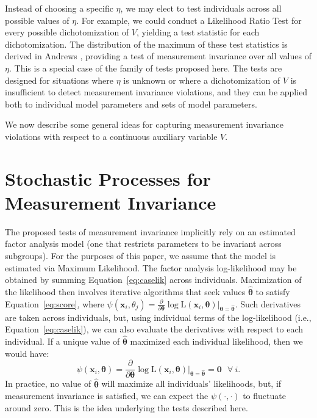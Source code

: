 \documentclass[man]{apa}
\begin{document}
Instead of choosing a specific $\eta$, we may elect to test
individuals across all possible values of $\eta$.  For example, we
could conduct a Likelihood Ratio Test for every possible
dichotomization of $V$, yielding a test statistic for each
dichotomization.  The distribution of the maximum of these test
statistics is derived in Andrews \citeyear{And93}, providing a test of
measurement invariance over all values of $\eta$.  
This is a special case of the family of tests proposed here.  The
tests are designed for situations where
$\eta$ is unknown or where a dichotomization of $V$ is insufficient to
detect measurement invariance violations, and they can be applied both
to individual model parameters and sets of model parameters.

We now describe some general ideas for capturing measurement
invariance violations with respect to a continuous auxiliary variable
$V$.



\section{Stochastic Processes for Measurement Invariance}
The proposed tests of measurement invariance implicitly rely on an
estimated factor analysis model (one that restricts parameters to be
invariant across subgroups).  For the purposes of this paper, we
assume that the model is estimated via Maximum Likelihood.  
The factor analysis log-likelihood may be obtained by summing 
Equation~\eqref{eq:caselik} across individuals.  
Maximization of the likelihood then involves iterative 
algorithms that seek values $\widehat{{\bm{\theta}}}$ to satisfy
Equation~\eqref{eq:score}, where 
$\psi(\bm{x}_i, \theta_j) = \frac{\partial}{\partial \bm{\theta}} \log
\text{L}({\bm{x}}_i, 
{\bm{\theta}}) \big |_{\bm{\theta} = \widehat{\bm{\theta}}}$.
Such derivatives are taken across individuals, but, using individual
terms of the log-likelihood (i.e., Equation~\eqref{eq:caselik}),
we can also 
evaluate the derivatives with respect to each individual.
If a unique value of $\widehat{{\bm{\theta}}}$ maximized
each individual likelihood, then we would have:
\begin{equation}
    \label{eq:casederiv}
    \psi({\bm{x}}_i, \bm{\theta}) = \frac{\partial}{\partial \bm{\theta}} \log
\text{L}({\bm{x}}_i, 
{\bm{\theta}}) \bigg |_{\bm{\theta} = \widehat{\bm{\theta}}} = \bm{0}\ \ \ \forall\ i.
\end{equation}
In practice, no value of $\widehat{{\bm{\theta}}}$ will maximize all
individuals' likelihoods, but, if measurement invariance is satisfied, 
we can expect the $\psi(\cdot, \cdot)$ to fluctuate around zero.  This
is the idea underlying the tests described here.
\end{document}
